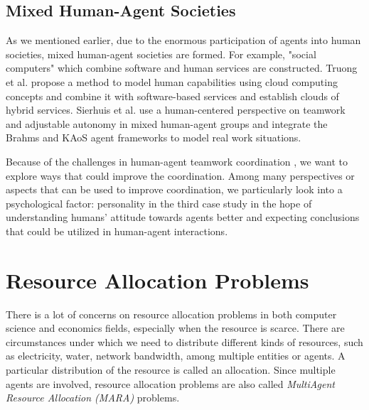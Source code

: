 \subsection{Mixed Human-Agent Societies}    
\label{ch1:mixedHumAgeSoc}
As we mentioned earlier, due to the enormous participation of agents into human societies, mixed human-agent societies are formed. For example, "social computers" which combine software and human services are constructed. Truong et al. \cite{truong2013} \cite{truong2012} propose a method to model human capabilities using cloud computing concepts and combine it with software-based services and establish clouds of hybrid services. Sierhuis et al. \cite{bradshaw2003} use a human-centered perspective on teamwork and adjustable autonomy in mixed human-agent groups and integrate the Brahms \cite{clancey1998} and KAoS \cite{uszok2004} agent frameworks to model real work situations. 

Because of the challenges in human-agent teamwork coordination \cite{bradshaw2008}, we want to explore ways that could improve the coordination. Among many perspectives or aspects that can be used to improve coordination, we particularly look into a psychological factor: personality in the third case study in the hope of understanding humans' attitude towards agents better and expecting conclusions that could be utilized in human-agent interactions.       

\section{Resource Allocation Problems}
\label{ch1:resourceAllPro}

There is a lot of concerns on resource allocation problems in both computer science and economics fields, especially when the resource is scarce. There are circumstances under which we need to distribute different kinds of resources, such as electricity, water, network bandwidth, among multiple entities or agents. A particular distribution of the resource is called an allocation. Since multiple agents are involved, resource allocation problems are also called \emph{MultiAgent Resource Allocation (MARA)} problems.

